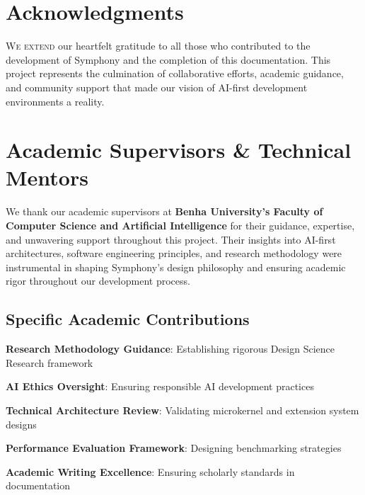 
\section*{Acknowledgments}

\lettrine{W}{e extend} our heartfelt gratitude to all those who contributed to the development of Symphony and the completion of this  documentation. This project represents the culmination of collaborative efforts, academic guidance, and community support that made our vision of AI-first development environments a reality.

\section*{Academic Supervisors \& Technical Mentors}

\begin{infobox}[title=Academic Excellence \& Research Guidance]
We thank our academic supervisors at \textbf{Benha University's Faculty of Computer Science and Artificial Intelligence} for their guidance, expertise, and unwavering support throughout this project. Their insights into AI-first architectures, software engineering principles, and research methodology were instrumental in shaping Symphony's design philosophy and ensuring academic rigor throughout our development process.
\end{infobox}

\subsection*{Specific Academic Contributions}
\begin{expandedlist}
    \item \textbf{Research Methodology Guidance}: Establishing rigorous Design Science Research framework
    \item \textbf{AI Ethics Oversight}: Ensuring responsible AI development practices
    \item \textbf{Technical Architecture Review}: Validating microkernel and extension system designs
    \item \textbf{Performance Evaluation Framework}: Designing  benchmarking strategies
    \item \textbf{Academic Writing Excellence}: Ensuring scholarly standards in documentation
\end{expandedlist}

